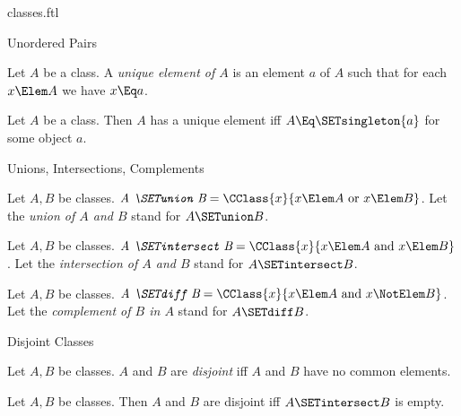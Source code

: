 \documentclass{stex}
\begin{document}
\begin{smodule}{classes.ftl}
\begin{sfragment}{Unordered Pairs}
  \begin{definition}[forthel,for=unique element]
    Let $A$ be a class.
    A \emph{unique element of $A$} is an element $a$ of $A$ such that for each $x \Elem A$ we have $x \Eq a$.
  \end{definition}

  \begin{proposition}[forthel]
    Let $A$ be a class.
    Then $A$ has a unique element iff $A \Eq \SETsingleton{a}$ for some object $a$.
  \end{proposition}
\end{sfragment}

\begin{sfragment}{Unions, Intersections, Complements}
  \begin{definition}[forthel,for={SETunion,union}]
    Let $A, B$ be classes.
    $\emph{A \SETunion B} = \CClass{x}{x \Elem A\text{ or }x \Elem B}$.
    Let the \emph{union of $A$ and $B$} stand for $A \SETunion B$.
  \end{definition}

  \begin{definition}[forthel,for={SETintersect,intersection}]
    Let $A, B$ be classes.
    $\emph{A \SETintersect B} = \CClass{x}{x \Elem A\text{ and }x \Elem B}$.
    Let the \emph{intersection of $A$ and $B$} stand for $A \SETintersect B$.
  \end{definition}

  \begin{definition}[forthel,for={SETdiff,complement}]
    Let $A, B$ be classes.
    $\emph{A \SETdiff B} = \CClass{x}{x \Elem A\text{ and }x \NotElem B}$.
    Let the \emph{complement of $B$ in $A$} stand for $A \SETdiff B$.
  \end{definition}
\end{sfragment}

\begin{sfragment}{Disjoint Classes}
  \begin{definition}[forthel,for=disjoint]
    Let $A, B$ be classes.
    $A$ and $B$ are \emph{disjoint} iff $A$ and $B$ have no common elements.
  \end{definition}

  \begin{proposition}[forthel]
    Let $A, B$ be classes.
    Then $A$ and $B$ are disjoint iff $A \SETintersect B$ is empty.
  \end{proposition}
\end{sfragment}
\end{smodule}
\end{document}
